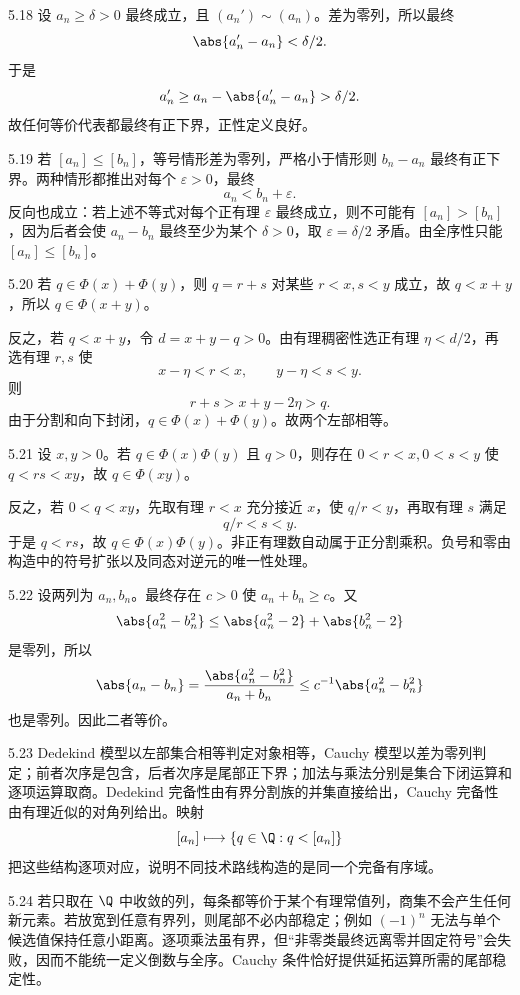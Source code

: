 \begin{solution}{5.18}
设 \(a_n\ge\delta>0\) 最终成立，且 \((a_n')\sim(a_n)\)。差为零列，所以最终
\[
 \abs{a_n'-a_n}<\delta/2.
\]
于是
\[
 a_n'\ge a_n-\abs{a_n'-a_n}>\delta/2.
\]
故任何等价代表都最终有正下界，正性定义良好。
\end{solution}

\begin{solution}{5.19}
若 \([a_n]\le[b_n]\)，等号情形差为零列，严格小于情形则 \(b_n-a_n\) 最终有正下界。两种情形都推出对每个 \(\varepsilon>0\)，最终
\[
 a_n<b_n+\varepsilon.
\]
反向也成立：若上述不等式对每个正有理 \(\varepsilon\) 最终成立，则不可能有 \([a_n]>[b_n]\)，因为后者会使 \(a_n-b_n\) 最终至少为某个 \(\delta>0\)，取 \(\varepsilon=\delta/2\) 矛盾。由全序性只能 \([a_n]\le[b_n]\)。
\end{solution}

\begin{solution}{5.20}
若 \(q\in\Phi(x)+\Phi(y)\)，则 \(q=r+s\) 对某些 \(r<x,s<y\) 成立，故 \(q<x+y\)，所以 \(q\in\Phi(x+y)\)。

反之，若 \(q<x+y\)，令 \(d=x+y-q>0\)。由有理稠密性选正有理 \(\eta<d/2\)，再选有理 \(r,s\) 使
\[
 x-\eta<r<x,\qquad y-\eta<s<y.
\]
则
\[
 r+s>x+y-2\eta>q.
\]
由于分割和向下封闭，\(q\in\Phi(x)+\Phi(y)\)。故两个左部相等。
\end{solution}

\begin{solution}{5.21}
设 \(x,y>0\)。若 \(q\in\Phi(x)\Phi(y)\) 且 \(q>0\)，则存在 \(0<r<x,0<s<y\) 使 \(q<rs<xy\)，故 \(q\in\Phi(xy)\)。

反之，若 \(0<q<xy\)，先取有理 \(r<x\) 充分接近 \(x\)，使 \(q/r<y\)，再取有理 \(s\) 满足
\[
 q/r<s<y.
\]
于是 \(q<rs\)，故 \(q\in\Phi(x)\Phi(y)\)。非正有理数自动属于正分割乘积。负号和零由构造中的符号扩张以及同态对逆元的唯一性处理。
\end{solution}

\begin{solution}{5.22}
设两列为 \(a_n,b_n\)。最终存在 \(c>0\) 使 \(a_n+b_n\ge c\)。又
\[
 \abs{a_n^2-b_n^2}
 \le\abs{a_n^2-2}+\abs{b_n^2-2}
\]
是零列，所以
\[
 \abs{a_n-b_n}
 =\frac{\abs{a_n^2-b_n^2}}{a_n+b_n}
 \le c^{-1}\abs{a_n^2-b_n^2}
\]
也是零列。因此二者等价。
\end{solution}

\begin{solution}{5.23}
Dedekind 模型以左部集合相等判定对象相等，Cauchy 模型以差为零列判定；前者次序是包含，后者次序是尾部正下界；加法与乘法分别是集合下闭运算和逐项运算取商。Dedekind 完备性由有界分割族的并集直接给出，Cauchy 完备性由有理近似的对角列给出。映射
\[
 [a_n]\longmapsto\{q\in\Q:q<[a_n]\}
\]
把这些结构逐项对应，说明不同技术路线构造的是同一个完备有序域。
\end{solution}

\begin{solution}{5.24}
若只取在 \(\Q\) 中收敛的列，每条都等价于某个有理常值列，商集不会产生任何新元素。若放宽到任意有界列，则尾部不必内部稳定；例如 \((-1)^n\) 无法与单个候选值保持任意小距离。逐项乘法虽有界，但“非零类最终远离零并固定符号”会失败，因而不能统一定义倒数与全序。Cauchy 条件恰好提供延拓运算所需的尾部稳定性。
\end{solution}


